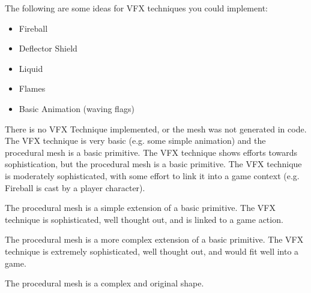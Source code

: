 \documentclass{../../../fal_assignment}
\begin{document}
The following are some ideas for VFX techniques you could implement:

\begin{itemize}
	\item Fireball
	\item Deflector Shield 
	\item Liquid
	\item Flames
	\item Basic Animation (waving flags)
\end{itemize}

\begin{markingrubric}
		
	\grade\fail There is no VFX Technique implemented, or the mesh was not generated in code.
	\grade The VFX technique is very basic (e.g. some simple animation) and the procedural mesh is a basic primitive.
	\grade The VFX technique shows efforts towards sophistication, but the procedural mesh is a basic primitive.
	\grade The VFX technique is moderately sophisticated, with some effort to link it into a game context (e.g. Fireball is cast by a player character).
		\par The procedural mesh is a simple extension of a basic primitive.
	\grade The VFX technique is sophisticated, well thought out, and is linked to a game action.
		\par The procedural mesh is a more complex extension of a basic primitive.
	\grade The VFX technique is extremely sophisticated, well thought out, and would fit well into a game.
		\par The procedural mesh is a complex and original shape.


\end{markingrubric}
\end{document}
